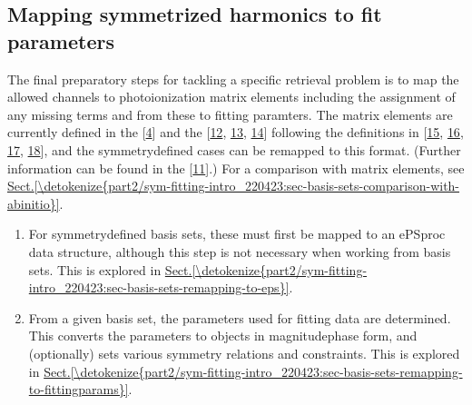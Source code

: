 \documentclass[letterpaper,table,10pt,english]{jupyterBook}
\begin{document}
\subsection{Mapping symmetrized harmonics to fit parameters}
\label{\detokenize{part2/sym-fitting-intro_220423:mapping-symmetrized-harmonics-to-fit-parameters}}\label{\detokenize{part2/sym-fitting-intro_220423:sec-basis-sets-mapping-params}}
\sphinxAtStartPar
The final preparatory steps for tackling a specific retrieval problem is to map the allowed channels to photoionization matrix elements \sphinxhyphen{} including the assignment of any missing terms \sphinxhyphen{} and from these to fitting paramters. The matrix elements are currently defined in the  {[}\hyperlink{cite.backmatter/bibliography:id618}{4}{]} and the  {[}\hyperlink{cite.backmatter/bibliography:id605}{12}, \hyperlink{cite.backmatter/bibliography:id547}{13}, \hyperlink{cite.backmatter/bibliography:id545}{14}{]} following the definitions in  {[}\hyperlink{cite.backmatter/bibliography:id693}{15}, \hyperlink{cite.backmatter/bibliography:id567}{16}, \hyperlink{cite.backmatter/bibliography:id725}{17}, \hyperlink{cite.backmatter/bibliography:id696}{18}{]}, and the symmetry\sphinxhyphen{}defined cases can be remapped to this format. (Further information can be found in the  {[}\hyperlink{cite.backmatter/bibliography:id617}{11}{]}.) For a comparison with  matrix elements, see \hyperref[\detokenize{part2/sym-fitting-intro_220423:sec-basis-sets-comparison-with-abinitio}]{Sect.\@ \ref{\detokenize{part2/sym-fitting-intro_220423:sec-basis-sets-comparison-with-abinitio}}}.
\begin{enumerate}
%
\item {} 
\sphinxAtStartPar
For symmetry\sphinxhyphen{}defined basis sets, these must first be mapped to an ePSproc data structure, although this step is not necessary when working from  basis sets. This is explored in \hyperref[\detokenize{part2/sym-fitting-intro_220423:sec-basis-sets-remapping-to-eps}]{Sect.\@ \ref{\detokenize{part2/sym-fitting-intro_220423:sec-basis-sets-remapping-to-eps}}}.

\item {} 
\sphinxAtStartPar
From a given basis set, the parameters used for fitting data are determined. This converts the parameters to  objects in magnitude\sphinxhyphen{}phase form, and (optionally) sets various symmetry relations and constraints. This is explored in \hyperref[\detokenize{part2/sym-fitting-intro_220423:sec-basis-sets-remapping-to-fittingparams}]{Sect.\@ \ref{\detokenize{part2/sym-fitting-intro_220423:sec-basis-sets-remapping-to-fittingparams}}}.

\end{enumerate}
\end{document}

